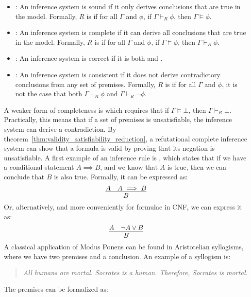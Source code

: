 \begin{itemize}
    \item {}: An inference system is sound if it only derives conclusions that are true in the model. Formally, \(R\) is  if for all \(\Gamma\) and \(\phi\), if \(\Gamma \vdash_{R} \phi\), then \(\Gamma\models\phi\).
    \item {}: An inference system is complete if it can derive all conclusions that are true in the model. Formally, \(R\) is  if for all \(\Gamma\) and \(\phi\), if \(\Gamma\models\phi\), then \(\Gamma \vdash_{R} \phi\).
    \item {}: An inference system is correct if it is both  and .
    \item {}: An inference system is consistent if it does not derive contradictory conclusions from any set of premises. Formally, \(R\) is  if for all \(\Gamma\) and \(\phi\), it is not the case that both \(\Gamma \vdash_{R} \phi\) and \(\Gamma \vdash_{R} \neg \phi\).
\end{itemize}
A weaker form of completeness is  which requires that if \(\Gamma \models \bot\), then \(\Gamma \vdash_{R} \bot\).  Practically, this means that if a set of premises is unsatisfiable, the inference system can derive a contradiction.
By theorem~\ref{thm:validity_satisfiability_reduction}, a refutational complete inference system can show that a formula is valid by proving that its negation is unsatisfiable.
A first example of an inference rule is , which states that if we have a conditional statement \(A \implies B\), and we know that \(A\) is true, then we can conclude that \(B\) is also true. Formally, it can be expressed as:
\begin{equation}  
  \infer{B}{A & A \implies B}
\end{equation}
Or, alternatively, and more conveniently for formulae in CNF, we can express it as:
\begin{equation}  
  \infer{B}{A & \neg A \lor B}
\end{equation}
A classical application of Modus Ponens can be found in Aristotelian syllogisms, where we have two premises and a conclusion.
An example of a syllogism is:
\begin{quote}
  \emph{All humans are mortal. Socrates is a human. Therefore, Socrates is mortal}.
\end{quote}
The premises can be formalized as:
